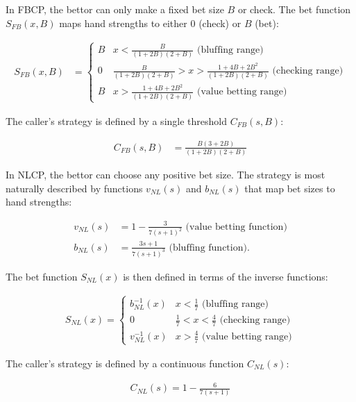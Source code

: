 \documentclass[../../main/main.tex]{subfiles}
\begin{document}
In FBCP, the bettor can only make a fixed bet size $B$ or check. The bet function $S_{FB}(x, B)$ maps hand strengths to either $0$ (check) or $B$ (bet):

\begin{align}
	S_{FB}(x, B) & = \begin{cases}
    B & x < \frac{B}{(1+2B)(2+B)} \text{ (bluffing range)}\\
    0 & \frac{B}{(1+2B)(2+B)} > x > \frac{1 + 4B + 2B^2}{(1+2B)(2+B)} \text{ (checking range)}\\
    B & x > \frac{1 + 4B + 2B^2}{(1+2B)(2+B)} \text{ (value betting range)}
\end{cases}
\end{align}

The caller's strategy is defined by a single threshold $C_{FB}(s, B)$:

\begin{align}
C_{FB}(s, B) & = \frac{B(3 +2B)}{(1+2B)(2+B)}
\end{align}

In NLCP, the bettor can choose any positive bet size. The strategy is most naturally described by functions $v_{NL}(s)$ and $b_{NL}(s)$ that map bet sizes to hand strengths:

\begin{align*}
    v_{NL}(s) &= 1 - \frac{3}{7(s+1)^2} \text{ (value betting function)} \\
    b_{NL}(s) &= \frac{3s+1}{7(s+1)^3} \text{ (bluffing function)}.
\end{align*}

The bet function $S_{NL}(x)$ is then defined in terms of the inverse functions:

\begin{align*}
    S_{NL}(x) = \begin{cases}
        b_{NL}^{-1}(x) & x < \frac{1}{7} \text{ (bluffing range)} \\
        0 & \frac{1}{7} < x < \frac{4}{7} \text{ (checking range)} \\
        v_{NL}^{-1}(x) & x > \frac{4}{7} \text{ (value betting range)}
    \end{cases}
\end{align*}

The caller's strategy is defined by a continuous function $C_{NL}(s)$:

\begin{align*}
    C_{NL}(s) = 1 - \frac{6}{7 (s+1)}
\end{align*}
\end{document}
